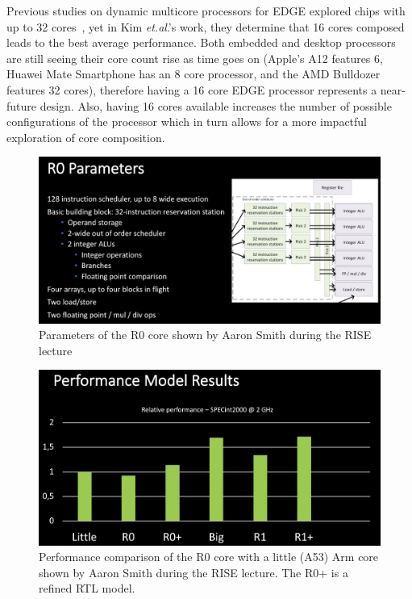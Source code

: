 Previous studies on dynamic multicore processors for EDGE explored chips with up to 32 cores~\cite{kim2007tflex, gulati2008multitaskingdmc}, yet in Kim {\it et.al}.'s work, they determine that 16 cores composed leads to the best average performance.
Both embedded and desktop processors are still seeing their core count rise as time goes on (Apple's A12 features 6, Huawei Mate Smartphone has an 8 core processor, and the AMD Bulldozer features 32 cores), therefore having a 16 core EDGE processor represents a near-future design.
Also, having 16 cores available increases the number of possible configurations of the processor which in turn allows for a more impactful exploration of core composition.

\begin{figure}[t]
  \centering
    \includegraphics[width=1\textwidth]{setup/r0_parameters.png}
    \caption{Parameters of the R0 core shown by Aaron Smith during the RISE lecture}\label{fig:r0}
\end{figure}

\begin{figure}[t]
  \centering
    \includegraphics[width=1\textwidth]{setup/results.png}
    \caption{Performance comparison of the R0 core with a little (A53) Arm core shown by Aaron Smith during the RISE lecture. The R0+ is a refined RTL model.}\label{fig:r0perf}
\end{figure}

